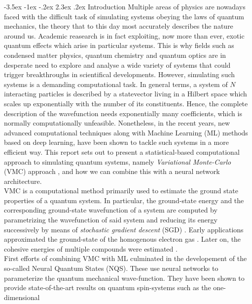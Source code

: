 \documentclass[a4paper, 12pt, oneside]{article}
\makeatletter
\renewcommand{\section}{\@startsection {section}{1}{\z@}%
             {-3.5ex \@plus -1ex \@minus -.2ex}%
             {2.3ex \@plus.2ex}%
             {\normalfont\normalsize\bfseries}}
\makeatother
\begin{document}
\section{Introduction}
Multiple areas of physics are nowadays faced with the difficult task of simulating systems obeying the laws of 
quantum mechanics, the theory that to this day most accurately describes the nature around us. Academic reasearch 
is in fact exploiting, now more than ever, exotic quantum effects which arise in particular systems. This is why 
fields such as condensed matter physics, quantum chemistry and quantum optics are in desperate need to explore 
and analyse a wide variety of systems that could trigger breakthroughs in scientifical developments. 
However, simulating such systems is a demanding computational task. In general terms, a system of $N$ interacting 
particles is described by a statevector living in a Hilbert space which scales up exponentially with the number of 
its constituents. Hence, the complete description of the wavefunction needs exponentially many coefficients, which 
is normally computationally unfeasible. Nonetheless, in the recent years, new advanced computational techniques 
along with Machine Learning (ML) methods based on deep learning, have been shown to tackle such systems in a more efficient way. 
This report sets out to present a statistical-based computational approach to simulating quantum systems, 
namely \textit{Variational Monte-Carlo} (VMC) approach \cite{mcmillan_ground_1965}, and how we can combine this 
with a neural network architecture.\\
VMC is a computational method primarily used to estimate the ground state properties of a quantum system. 
In particular, the ground-state energy and the corresponding ground-state wavefunction of a system are computed 
by parametrizing the wavefunction of said system and reducing its energy successively by means of 
\textit{stochastic gradient descent} (SGD) \cite{ruder_overview_2016}. Early applications approximated the ground-state of 
the homogenous electron gas \cite{ceperley_ground_1978, ortiz_correlation_1994}. Later on, the cohesive energies of multiple compounds 
were estimated \cite{li_cohesive_1991, rajagopal_variational_1995, malatesta_variational_1997}.  \\
First efforts of combining VMC with ML culminated in the developement of the so-called Neural Quantum 
States (NQS). These use neural networks to parameterize the quantum mechanical wave-function. They 
have been shown to provide state-of-the-art results on quantum spin-systems such as the one-dimensional 
\end{document}
